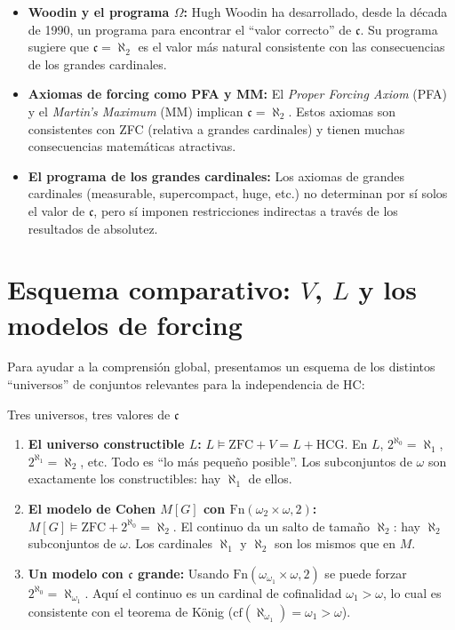 \begin{itemize}[leftmargin=2em]
  \item \textbf{Woodin y el programa $\Omega$:} Hugh Woodin ha desarrollado, desde la década de 1990, un programa para encontrar el ``valor correcto'' de $\mathfrak{c}$. Su programa sugiere que $\mathfrak{c} = \aleph_2$ es el valor más natural consistente con las consecuencias de los grandes cardinales.
  \item \textbf{Axiomas de forcing como PFA y MM:} El \emph{Proper Forcing Axiom} (PFA) y el \emph{Martin's Maximum} (MM) implican $\mathfrak{c} = \aleph_2$. Estos axiomas son consistentes con ZFC (relativa a grandes cardinales) y tienen muchas consecuencias matemáticas atractivas.
  \item \textbf{El programa de los grandes cardinales:} Los axiomas de grandes cardinales (measurable, supercompact, huge, etc.) no determinan por sí solos el valor de $\mathfrak{c}$, pero sí imponen restricciones indirectas a través de los resultados de absolutez.
\end{itemize}

\section{Esquema comparativo: $V$, $L$ y los modelos de forcing}

Para ayudar a la comprensión global, presentamos un esquema de los distintos ``universos'' de conjuntos relevantes para la independencia de HC:

\begin{ejemplo}{Tres universos, tres valores de $\mathfrak{c}$}{}
\begin{enumerate}[leftmargin=2em, label=(\alph*)]
  \item \textbf{El universo constructible $L$:} $L \models \mathrm{ZFC} + V = L + \mathrm{HCG}$. En $L$, $2^{\aleph_0} = \aleph_1$, $2^{\aleph_1} = \aleph_2$, etc. Todo es ``lo más pequeño posible''. Los subconjuntos de $\omega$ son exactamente los constructibles: hay $\aleph_1$ de ellos.
  \item \textbf{El modelo de Cohen $M[G]$ con $\mathrm{Fn}(\omega_2 \times \omega, 2)$:} $M[G] \models \mathrm{ZFC} + 2^{\aleph_0} = \aleph_2$. El continuo da un salto de tamaño $\aleph_2$: hay $\aleph_2$ subconjuntos de $\omega$. Los cardinales $\aleph_1$ y $\aleph_2$ son los mismos que en $M$.
  \item \textbf{Un modelo con $\mathfrak{c}$ grande:} Usando $\mathrm{Fn}(\omega_{\omega_1} \times \omega, 2)$ se puede forzar $2^{\aleph_0} = \aleph_{\omega_1}$. Aquí el continuo es un cardinal de cofinalidad $\omega_1 > \omega$, lo cual es consistente con el teorema de König ($\mathrm{cf}(\aleph_{\omega_1}) = \omega_1 > \omega$).
\end{enumerate}
\end{ejemplo}

